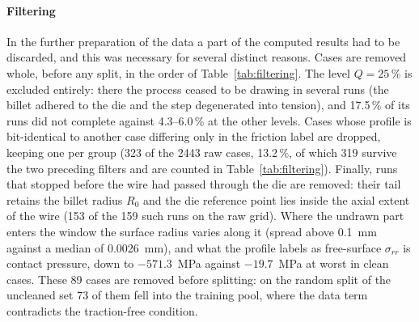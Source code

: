 \documentclass[subscriptcorrection,upint,varvw,barcolor=Goldenrod3,mathalfa=cal=euler,balance,hyphenate,french,pdf-a]{asmejour} %
\begin{document}
\paragraph{Filtering}
In the further preparation of the data a part of the computed results had to be discarded, and this was necessary for several distinct reasons. Cases are removed whole, before any split, in the order of Table~\ref{tab:filtering}. The level $Q=25\,\%$ is excluded entirely: there the process ceased to be drawing in several runs (the billet adhered to the die and the step degenerated into tension), and 17.5\,\% of its runs did not complete against 4.3--6.0\,\% at the other levels. %
Cases whose profile is bit-identical to another case differing only in the friction label are dropped, keeping one per group (323 of the 2443 raw cases, 13.2\,\%, of which 319 survive the two preceding filters and are counted in Table~\ref{tab:filtering}). %
Finally, runs that stopped before the wire had passed through the die are removed: their tail retains the billet radius $R_0$ and the die reference point lies inside the axial extent of the wire (153 of the 159 such runs on the raw grid). %
Where the undrawn part enters the window the surface radius varies along it (spread above 0.1~mm against a median of 0.0026~mm), and what the profile labels as free-surface $\sigma_{rr}$ is contact pressure, down to $-571.3$~MPa against $-19.7$~MPa at worst in clean cases. %
These 89 cases are removed before splitting: on the random split of the uncleaned set 73 of them fell into the training pool, where the data term contradicts the traction-free condition. %
\end{document}
